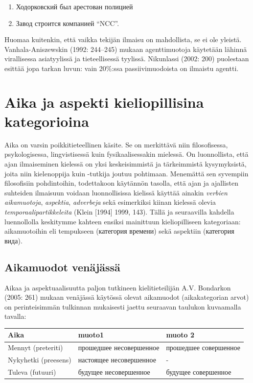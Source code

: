 \documentclass[]{scrreprt}
\providecommand{\tightlist}{%
  \setlength{\itemsep}{0pt}\setlength{\parskip}{0pt}}
\begin{document}
\begin{enumerate}
\def\labelenumi{(\arabic{enumi})}
\setcounter{enumi}{239}
\tightlist
\item
  Ходорковский был арестован полицией
\item
  Завод строится компанией ``NCC''.
\end{enumerate}

Huomaa kuitenkin, että vaikka tekijän ilmaisu on mahdollista, se ei ole
yleistä. Vanhala-Aniszewskin (1992: 244--245) mukaan agenttimuotoja
käytetään lähinnä virallisessa asiatyylissä ja tieteellisessä tyylissä.
Nikunlassi (2002: 200) puolestaan esittää jopa tarkan luvun: vain
20\%:ssa passiivimuodoista on ilmaistu agentti.

\chapter{Aika ja aspekti kieliopillisina
kategorioina}\label{luento-15-aika-ja-aspekti-kieliopillisina-kategorioina}


Aika on varsin poikkitieteellinen käsite. Se on merkittävä niin
filosofisessa, psykologisessa, lingvistisessä kuin fysikaalisessakin
mielessä. On luonnollista, että ajan ilmaiseminen kielessä on yksi
keskeisimmistä ja tärkeimmistä kysymyksistä, joita niin kielenoppija
kuin -tutkija joutuu pohtimaan. Menemättä sen syvempiin filosofisiin
pohdintoihin, todettakoon käytännön tasolla, että ajan ja ajallisten
suhteiden ilmaisuun voidaan luonnollisissa kielissä käyttää ainakin
\emph{verbien aikamuotoja}, \emph{aspektia}, \emph{adverbeja} sekä
esimerkiksi kiinan kielessä olevia \emph{temporaalipartikkeleita} (Klein
{[}1994{]} 1999, 143). Tällä ja seuraavilla kahdella luennollolla
keskitymme kahteen ensiksi mainittuun kieliopilliseen kategoriaan:
aikamuotoihin eli tempukseen (категория времени) sekä aspektiin
(категория вида).

\section{Aikamuodot venäjässä}\label{aikamuodot-venuxe4juxe4ssuxe4}

Aikaa ja aspektuaalisuutta paljon tutkineen kielitieteilijän A.V.
Bondarkon (2005: 261) mukaan venäjässä käytössä olevat aikamuodot
(aikakategorian arvot) on perinteisimmän tulkinnan mukaisesti jaettu
seuraavan taulukon kuvaamalla tavalla:

\begin{longtable}[c]{@{}lll@{}}
\toprule
Aika & muoto1 & muoto 2\tabularnewline
\midrule
\endhead
Mennyt (preteriti) & прошедшее несовершенное & прошедшее
совершенное\tabularnewline
Nykyhetki (preesens) & настоящее несовершенное & -\tabularnewline
Tuleva (futuuri) & будущее несовершенное & будущее
совершенное\tabularnewline
\bottomrule
\end{longtable}
\end{document}
